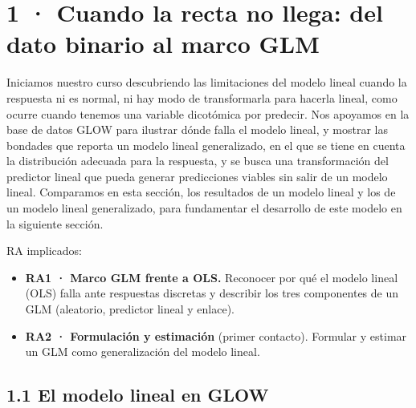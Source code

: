 \documentclass[
  letterpaper,
  DIV=11,
  numbers=noendperiod]{scrartcl}
\providecommand{\tightlist}{%
  \setlength{\itemsep}{0pt}\setlength{\parskip}{0pt}}\usepackage{longtable,booktabs,array}
\begin{document}
\hypertarget{sec-u11}{%
\section{1 · Cuando la recta no llega: del dato binario al marco
GLM}\label{sec-u11}}

Iniciamos nuestro curso descubriendo las limitaciones del modelo lineal
cuando la respuesta ni es normal, ni hay modo de transformarla para
hacerla lineal, como ocurre cuando tenemos una variable dicotómica por
predecir. Nos apoyamos en la base de datos GLOW para ilustrar dónde
falla el modelo lineal, y mostrar las bondades que reporta un modelo
lineal generalizado, en el que se tiene en cuenta la distribución
adecuada para la respuesta, y se busca una transformación del predictor
lineal que pueda generar predicciones viables sin salir de un modelo
lineal. Comparamos en esta sección, los resultados de un modelo lineal y
los de un modelo lineal generalizado, para fundamentar el desarrollo de
este modelo en la siguiente sección.

\begin{tcolorbox}[enhanced jigsaw, coltitle=black, rightrule=.15mm, arc=.35mm, leftrule=.75mm, colback=white, colbacktitle=quarto-callout-note-color!10!white, left=2mm, breakable, toptitle=1mm, toprule=.15mm, bottomtitle=1mm, titlerule=0mm, title=\textcolor{quarto-callout-note-color}{\faInfo}\hspace{0.5em}{Sobre esta unidad}, bottomrule=.15mm, opacityback=0, opacitybacktitle=0.6, colframe=quarto-callout-note-color-frame]

RA implicados:

\begin{itemize}
\tightlist
\item
  \textbf{RA1 · Marco GLM frente a OLS.} Reconocer por qué el modelo
  lineal (OLS) falla ante respuestas discretas y describir los tres
  componentes de un GLM (aleatorio, predictor lineal y enlace).
\item
  \textbf{RA2 · Formulación y estimación} (primer contacto). Formular y
  estimar un GLM como generalización del modelo lineal.
\end{itemize}

\end{tcolorbox}

\hypertarget{el-modelo-lineal-en-glow}{%
\subsection{1.1 El modelo lineal en
GLOW}\label{el-modelo-lineal-en-glow}}
\end{document}
